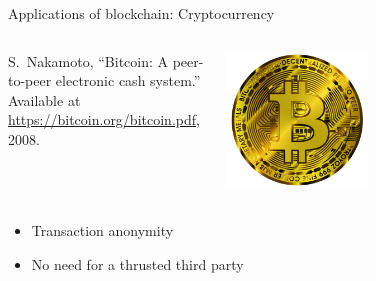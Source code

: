 \documentclass{beamer}
\begin{document}
\begin{frame}{Applications of blockchain: Cryptocurrency}
\begin{columns}
\begin{column}{0.5\textwidth}
   
{\footnotesize
\begin{thebibliography}{1}
S.~Nakamoto, ``Bitcoin: A peer-to-peer electronic cash system.'' Available at
  \href{https://bitcoin.org/bitcoin.pdf}{https://bitcoin.org/bitcoin.pdf},
  2008.
\end{thebibliography}  
}
\end{column}
\begin{column}{0.5\textwidth}  %
    \begin{center}
     \includegraphics[width=0.5\textwidth]{../../Figures/bitcoin-6284869_1920.png}
     \end{center}
\end{column}
\end{columns}

\begin{itemize}
  \item Transaction anonymity
  \item No need for a thrusted third party
\end{itemize}
\end{frame}
\end{document}
